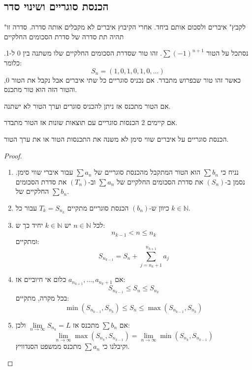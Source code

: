 \documentclass{tstextbook}
\begin{document}
\subsection{הכנסת סוגריים ושינוי סדר}

\begin{definition}
"לקבץ" איברים ולסכום אותם ביחד. אחרי הקיבוץ איברים לא מקבלים אותה סדרה. סדרה זו תהיה תת סדרה של סדרת הסכומים החלקיים

\end{definition}
\begin{example}
נסתכל על הטור \(\sum(-1)^{n+1}\). זהו טור שסדרת הסכומים החלקיים שלו משתנה בין 0 ל-1. כלומר:
$$S_{n}=\left( 1,0,1,0,1,0,\dots \right)$$
כאשר זהו טור שבפרוש מתבדר. אם נכניס סוגריים כל שתי איברים אבל נקבל את הטור 0, והטור הזה הוא טור מתכנס.

\end{example}
\begin{proposition}
אם הטור מתכנס אז ניתן להכניס סוגרים וערך הטור לא ישתנה.

\end{proposition}
\begin{proposition}
אם קיימים 2 הכנסות סוגריים עם תוצאות שונות אז הטור מתבדר.

\end{proposition}
\begin{proposition}
הכנסת סוגריים על איברים שווי סימן לא משנה את התכנסות הטור או את ערך הטור.

\end{proposition}
\begin{proof}
  \begin{enumerate}
    \item נניח כי \(\sum b_{n}\) הוא הטור המתקבל מהכנסת סוגריים של \(\sum a_{n}\) עבור איברי שווי סימן. נסמן ב-\((S_{n})\) את סדרת הסכומים החלקיים של \(\sum a_{n}\) וב-\((T_{n})\) את סדרת הסכומים החלקיים של \(\sum b_{n}\). 


    \item כיוון ש-\((b_{n})\) הכנסת סוגריים מתקיים \(T_{k}=S_{n_{k}}\) עבור כל \(k \in \mathbb{N}\). 


    \item לכל \(n \in \mathbb{N}\) יש \(k \in \mathbb{N}\) יחיד כך ש: 
$$n_{k-1}<n\leq n_{k}$$ 
ומתקיים:
$$S_{n_{k-1}}= S_{n}+ \sum_{j=n_{k}+1}^{n_{k+1}} a_{j}$$


    \item אם \(a_{n_{k+1}},\dots,a_{n_{k}+1}\) כלום אי חיוביים אז: 
$$S_{n_{k-1}}\leq S_{n}\leq S_{n_{k}}$$
בכל מקרה, מתקיים:
$$\min(S_{n_{k-1}},S_{n_{k}})\leq S_{n}\leq \max (S_{n_{k-1}},S_{n_{k}})$$


    \item אם \(\sum b_{n}\) מתכנס אז \(\underset{ n \to \infty }{\lim }S_{n_{k}}=L\) ולכן: 
$$\lim_{ n \to \infty } \max (S_{n_{k}},S_{n_{k-1}})=\lim_{ n \to \infty } \min(S_{n_{k}},S_{n_{k-1}})$$
וקיבלנו כי \(\sum a_{n}\) מתכנס ממשפט הסנדוויץ.


  \end{enumerate}
\end{proof}
\end{document}
